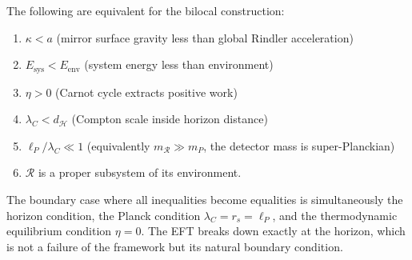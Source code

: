 \begin{prop}
\label{prop:eft}
The following are equivalent for the bilocal 
construction:
\begin{enumerate}
    \item $\kappa < a$ \quad 
    (mirror surface gravity less than global 
    Rindler acceleration)
    \item $E_{\mathrm{sys}} < E_{\mathrm{env}}$ 
    \quad (system energy less than environment)
    \item $\eta > 0$ \quad 
    (Carnot cycle extracts positive work)
    \item $\lambda_C < d_\mathcal{H}$ \quad 
    (Compton scale inside horizon distance)
    \item $\ell_P / \lambda_C \ll 1$ \quad
    (equivalently $m_\mathcal{R} \gg m_P$, 
    the detector mass is super-Planckian)
    \item $\mathcal{R}$ is a proper subsystem of 
    its environment.
\end{enumerate}
The boundary case where all inequalities become 
equalities is simultaneously the horizon 
condition, the Planck condition 
$\lambda_C = r_s = \ell_P$, and the 
thermodynamic equilibrium condition $\eta = 0$. 
The EFT breaks down exactly at the horizon, 
which is not a failure of the framework but 
its natural boundary condition.
\end{prop}
